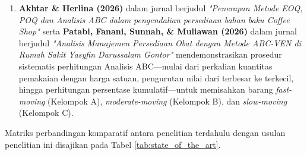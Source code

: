\documentclass[11pt, a4paper]{article}
\begin{document}
\begin{enumerate}[label=\arabic*.]
    \item \textbf{Akhtar \& Herlina (2026)} dalam jurnal berjudul \textit{"Penerapan Metode EOQ, POQ dan Analisis ABC dalam pengendalian persediaan bahan baku Coffee Shop"} serta \textbf{Patabi, Fanani, Sunnah, \& Muliawan (2026)} dalam jurnal berjudul \textit{"Analisis Manajemen Persediaan Obat dengan Metode ABC-VEN di Rumah Sakit Yasyfin Darussalam Gontor"} mendemonstrasikan prosedur sistematis perhitungan Analisis ABC---mulai dari perkalian kuantitas pemakaian dengan harga satuan, pengurutan nilai dari terbesar ke terkecil, hingga perhitungan persentase kumulatif---untuk memisahkan barang \textit{fast-moving} (Kelompok A), \textit{moderate-moving} (Kelompok B), dan \textit{slow-moving} (Kelompok C).
\end{enumerate}

Matriks perbandingan komparatif antara penelitian terdahulu dengan usulan penelitian ini disajikan pada Tabel \ref{tab:state_of_the_art}.
\end{document}
